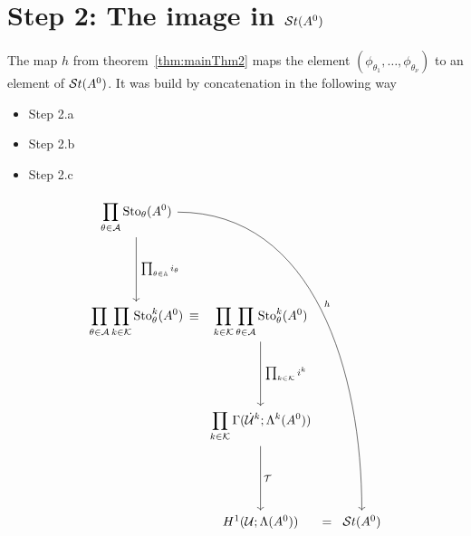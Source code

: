 \newpage
\section{Step 2: The image in $\mathcal{S}{}t(A^0)$}
The map $h$ from theorem~\ref{thm:mainThm2} maps the element
$(\phi_{\theta_1},\dots,\phi_{\theta_\nu})$ to an element of $\mathcal{S}{}t(A^0)$.
It was build by concatenation in the following way
\bgroup
{}
\begin{paracol}{2}\sloppy
\switchcolumn[0]\noindent
  \vspace*{40mm}
  \begin{itemize}
    \item[] Step 2.a 
    \item[] \qquad Step 2.b 
    \item[] \qquad \qquad Step 2.c 
  \end{itemize}
\switchcolumn[1]\noindent
  \[ \begin{tikzcd}[column sep=0,row sep=1.8cm]
      \displaystyle \prod_{\theta\in\cA}\Sto_\theta(A^0)
      \dar{\tikzmark{e1}\prod_{\theta\in\A}i_\theta}
      \arrow[dddrrrr, out=0,in=90,"h"]
    \\\displaystyle \prod_{\theta\in\cA}\prod_{k\in\cK}\Sto_\theta^k(A^0)
    &\tikzmark{e2}\!\!\!\!\equiv
    &\displaystyle \prod_{k\in\cK}\prod_{\theta\in\cA}\Sto_\theta^k(A^0)
      \dar{\tikzmark{e3}\prod_{k\in\cK}i^k}
    \\&&\displaystyle \prod_{k\in\cK}\Gamma(\dot\cU^k;\Lambda^k(A^0))
      \dar{\tikzmark{e4}\cT}
    \\&&H^1(\cU;\Lambda(A^0))&=&\St(A^0)
  \end{tikzcd} \]
\end{paracol}
\egroup

